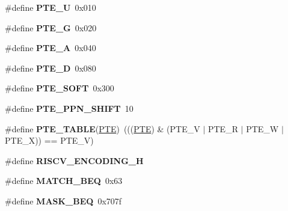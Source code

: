 \begin{DoxyCompactItemize}
\mbox{\label{riscv-utility_8h_adced9836a1dc98d72849361e6ab03cda}} 
\#define {\bfseries P\+T\+E\+\_\+U}~0x010
\item 
\mbox{\label{riscv-utility_8h_a50cfccabb1927e67c7a0e3b90e8b0635}} 
\#define {\bfseries P\+T\+E\+\_\+G}~0x020
\item 
\mbox{\label{riscv-utility_8h_af2d908a8af1d94a6aaf803ab40fe0951}} 
\#define {\bfseries P\+T\+E\+\_\+A}~0x040
\item 
\mbox{\label{riscv-utility_8h_ae80b38f12787d02087c4575c48c36d88}} 
\#define {\bfseries P\+T\+E\+\_\+D}~0x080
\item 
\mbox{\label{riscv-utility_8h_a8e71d0b15291edc78a3240cc667f9ad8}} 
\#define {\bfseries P\+T\+E\+\_\+\+S\+O\+FT}~0x300
\item 
\mbox{\label{riscv-utility_8h_a5b5b713a1ec901153c786686d5962574}} 
\#define {\bfseries P\+T\+E\+\_\+\+P\+P\+N\+\_\+\+S\+H\+I\+FT}~10
\item 
\mbox{\label{riscv-utility_8h_aa0a707cf44e82dc9efa94304582586a6}} 
\#define {\bfseries P\+T\+E\+\_\+\+T\+A\+B\+LE}(\mbox{\hyperlink{struct__PTE}{P\+TE}})~(((\mbox{\hyperlink{struct__PTE}{P\+TE}}) \& (P\+T\+E\+\_\+V $\vert$ P\+T\+E\+\_\+R $\vert$ P\+T\+E\+\_\+W $\vert$ P\+T\+E\+\_\+X)) == P\+T\+E\+\_\+V)
\item 
\mbox{\label{riscv-utility_8h_a67dae4da7a6dcfd0acaff75e622b0ae4}} 
\#define {\bfseries R\+I\+S\+C\+V\+\_\+\+E\+N\+C\+O\+D\+I\+N\+G\+\_\+H}
\item 
\mbox{\label{riscv-utility_8h_aa9a19cdee014b842259470a5c83c453d}} 
\#define {\bfseries M\+A\+T\+C\+H\+\_\+\+B\+EQ}~0x63
\item 
\mbox{\label{riscv-utility_8h_a77d55df58c8edb836fcc816d4f454d4e}} 
\#define {\bfseries M\+A\+S\+K\+\_\+\+B\+EQ}~0x707f
\item 
\mbox{\label{riscv-utility_8h_a29516a746ac596dda1bd2e30279f15d3}} 

\end{DoxyCompactItemize}
